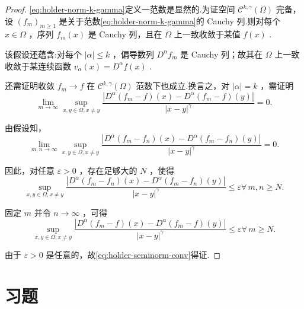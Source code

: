 \begin{proof}
\eqref{eq:holder-norm-k-gamma}定义一范数是显然的.为证空间 ${\mathcal{C}}^{k,\gamma }\left( \Omega \right)$ 完备，设 ${\left( {f}_{m}\right) }_{m \geq  1}$ 是关于范数\eqref{eq:holder-norm-k-gamma}的 Cauchy 列.则对每个 $x \in  \Omega$ ，序列 ${f}_{m}\left( x\right)$ 是 Cauchy 列，且在 $\Omega$ 上一致收敛于某值 $f\left( x\right)$ .

该假设还蕴含:对每个 $\left| \alpha \right|  \leq  k$ ，偏导数列 ${D}^{\alpha }{f}_{m}$ 是 Cauchy 列；故其在 $\Omega$ 上一致收敛于某连续函数 ${v}_{\alpha }\left( x\right)  = {D}^{\alpha }f\left( x\right)$ .

还需证明收敛 ${f}_{m} \rightarrow  f$ 在 ${\mathcal{C}}^{k,\gamma }\left( \Omega \right)$ 范数下也成立.换言之，对 $\left| \alpha \right|  = k$ ，需证明
\begin{equation}\tag{3.14}\label{eq:holder-seminorm-conv}
\mathop{\lim }\limits_{{m \rightarrow  \infty }}\mathop{\sup }\limits_{{x,y \in  \Omega ,x \neq  y}}\frac{\left| {D}^{\alpha }\left( {f}_{m} - f\right) \left( x\right)  - {D}^{\alpha }\left( {f}_{m} - f\right) \left( y\right) \right| }{{\left| x - y\right| }^{\gamma }} = 0.
\end{equation}

由假设知，
\[
\mathop{\lim }\limits_{{m,n \rightarrow  \infty }}\mathop{\sup }\limits_{{x,y \in  \Omega ,x \neq  y}}\frac{\left| {D}^{\alpha }\left( {f}_{m} - {f}_{n}\right) \left( x\right)  - {D}^{\alpha }\left( {f}_{m} - {f}_{n}\right) \left( y\right) \right| }{{\left| x - y\right| }^{\gamma }} = 0.
\]

因此，对任意 $\varepsilon  > 0$ ，存在足够大的 $N$ ，使得
\[
\mathop{\sup }\limits_{{x,y \in  \Omega ,x \neq  y}}\frac{\left| {D}^{\alpha }\left( {f}_{m} - {f}_{n}\right) \left( x\right)  - {D}^{\alpha }\left( {f}_{m} - {f}_{n}\right) \left( y\right) \right| }{{\left| x - y\right| }^{\gamma }} \leq  \varepsilon \forall\,m,n \geq  N.
\]

固定 $m$ 并令 $n \rightarrow  \infty$ ，可得
\[
\mathop{\sup }\limits_{{x,y \in  \Omega ,x \neq  y}}\frac{\left| {D}^{\alpha }\left( {f}_{m} - f\right) \left( x\right)  - {D}^{\alpha }\left( {f}_{m} - f\right) \left( y\right) \right| }{{\left| x - y\right| }^{\gamma }} \leq  \varepsilon \forall\,m \geq  N.
\]

由于 $\varepsilon  > 0$ 是任意的，故\eqref{eq:holder-seminorm-conv}得证.
\end{proof}

\section{习题}

